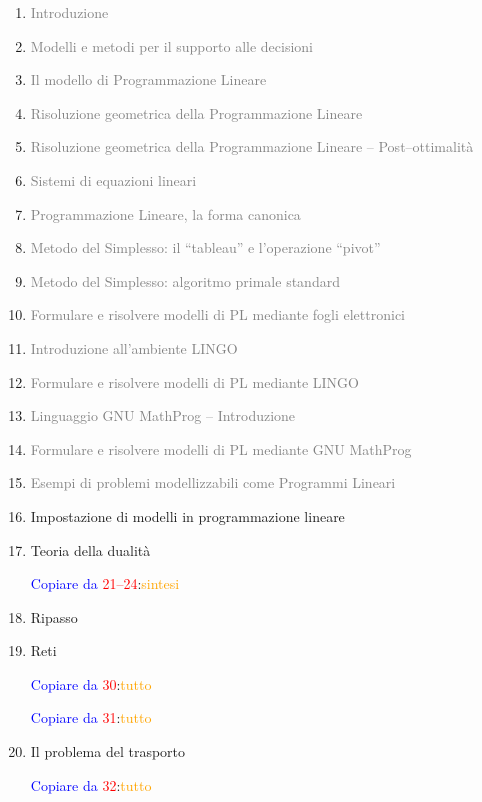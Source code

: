 \documentclass[a4paper,10pt]{article}
\newcommand{\copiare}[2]{%
  \begin{flushright}
  \textcolor{blue}{Copiare da }\textcolor{red}{#1}:\textcolor{orange}{#2}    
  \end{flushright}%
}
\begin{document}
\begin{enumerate}
 \item \textcolor{gray}{Introduzione}\modIntro
 \item \textcolor{gray}{Modelli e metodi per il supporto alle decisioni}\modRichiami
 \item \textcolor{gray}{Il modello di Programmazione Lineare}\modRichiami
 \item \textcolor{gray}{Risoluzione geometrica della Programmazione Lineare}\modRichiami
 \item \textcolor{gray}{Risoluzione geometrica della Programmazione Lineare -- Post--ottimalit\`a}\modRichiami
 \item \textcolor{gray}{Sistemi di equazioni lineari}\modRichiami
 \item \textcolor{gray}{Programmazione Lineare, la forma canonica}\modRichiami
 \item \textcolor{gray}{Metodo del Simplesso: il ``tableau'' e l'operazione ``pivot''}\modRichiami
 \item \textcolor{gray}{Metodo del Simplesso: algoritmo primale standard}\modRichiami
 \item \textcolor{gray}{Formulare e risolvere modelli di PL mediante fogli elettronici}\modSw
 \item \textcolor{gray}{Introduzione all'ambiente LINGO}\modSw
 \item \textcolor{gray}{Formulare e risolvere modelli di PL mediante LINGO}\modSw
 \item \textcolor{gray}{Linguaggio GNU MathProg -- Introduzione}\modSw
 \item \textcolor{gray}{Formulare e risolvere modelli di PL mediante GNU MathProg}\modSw
 \item  \textcolor{gray}{Esempi di problemi modellizzabili come Programmi Lineari}\modSw
 \item Impostazione di modelli in programmazione lineare\modSw
 \item Teoria della dualit\`a \copiare{21--24}{sintesi}
 \item Ripasso
 \item Reti \copiare{30}{tutto} \copiare{31}{tutto}
 \item Il problema del trasporto \copiare{32}{tutto}

\end{enumerate}
\end{document}
